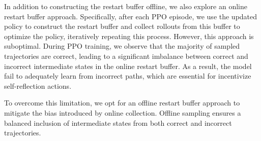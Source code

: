 In addition to constructing the restart buffer offline, we also explore an online restart buffer approach. Specifically, after each PPO episode, we use the updated policy to construct the restart buffer and collect rollouts from this buffer to optimize the policy, iteratively repeating this process. However, this approach is suboptimal. During PPO training, we observe that the majority of sampled trajectories are correct, leading to a significant imbalance between correct and incorrect intermediate states in the online restart buffer. As a result, the model fail to adequately learn from incorrect paths, which are essential for incentivize self-reflection actions.

To overcome this limitation, we opt for an offline restart buffer approach to mitigate the bias introduced by online collection. Offline sampling ensures a balanced inclusion of intermediate states from both correct and incorrect trajectories.